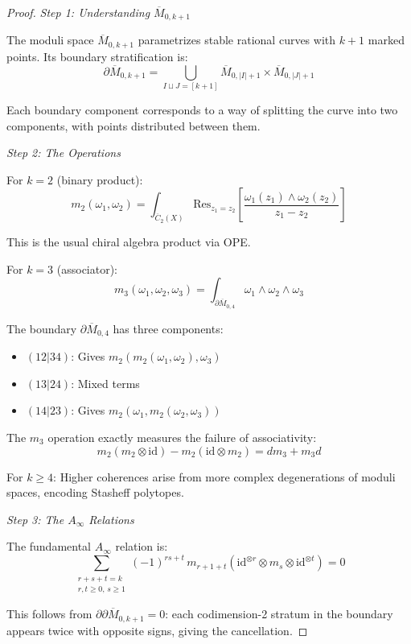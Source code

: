 \begin{proof}
\emph{Step 1: Understanding $\overline{M}_{0,k+1}$}

The moduli space $\overline{M}_{0,k+1}$ parametrizes stable rational curves with
$k+1$ marked points. Its boundary stratification is:
\[\partial \overline{M}_{0,k+1} = \bigcup_{I \sqcup J = [k+1]}
\overline{M}_{0,|I|+1} \times \overline{M}_{0,|J|+1}\]

Each boundary component corresponds to a way of splitting the curve into two
components, with points distributed between them.

\emph{Step 2: The Operations}

For $k=2$ (binary product):
\[m_2(\omega_1, \omega_2) = \int_{\overline{C}_2(X)}
\text{Res}_{z_1=z_2}\left[\frac{\omega_1(z_1) \wedge \omega_2(z_2)}{z_1-z_2}\right]\]

This is the usual chiral algebra product via OPE.

For $k=3$ (associator):
\[m_3(\omega_1, \omega_2, \omega_3) =
\int_{\partial \overline{M}_{0,4}} \omega_1 \wedge \omega_2 \wedge \omega_3\]

The boundary $\partial \overline{M}_{0,4}$ has three components:
\begin{itemize}
\item $(12|34)$: Gives $m_2(m_2(\omega_1,\omega_2),\omega_3)$
\item $(13|24)$: Mixed terms
\item $(14|23)$: Gives $m_2(\omega_1,m_2(\omega_2,\omega_3))$
\end{itemize}

The $m_3$ operation exactly measures the failure of associativity:
\[m_2(m_2 \otimes \text{id}) - m_2(\text{id} \otimes m_2) = d m_3 + m_3 d\]

For $k \geq 4$: Higher coherences arise from more complex degenerations of moduli
spaces, encoding Stasheff polytopes.

\emph{Step 3: The $A_\infty$ Relations}

The fundamental $A_\infty$ relation is:
\[\sum_{\substack{r+s+t=k \\ r,t \geq 0,\, s \geq 1}} (-1)^{rs+t}\,
m_{r+1+t}(\mathrm{id}^{\otimes r} \otimes m_s \otimes \mathrm{id}^{\otimes t}) = 0\]

This follows from $\partial \partial \overline{M}_{0,k+1} = 0$: each codimension-2
stratum in the boundary appears twice with opposite signs, giving the cancellation.
\end{proof}

